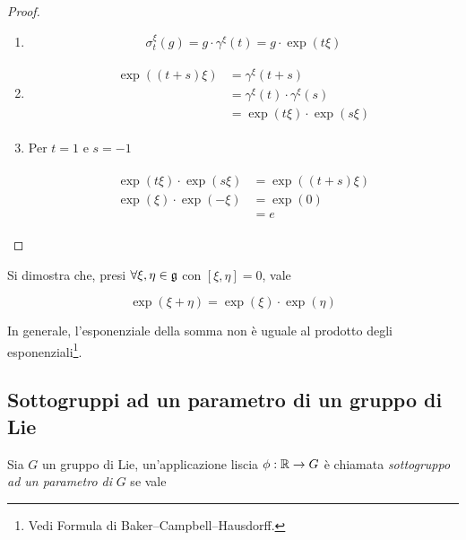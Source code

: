 \begin{proof}\hfill\break
	\begin{enumerate}
		\item %
		\begin{equation}
			\sigma_{t}^{\xi}(g) = g \cdot \gamma^{\xi}(t) = g \cdot \exp(t \xi)
		\end{equation}
		
		\item %
		\begin{align}
			\begin{split}
				\exp((t+s) \xi) &= \gamma^{\xi}(t+s)\\
				&= \gamma^{\xi}(t) \cdot \gamma^{\xi}(s)\\
				&= \exp(t \xi) \cdot \exp(s \xi)
			\end{split}
		\end{align}
		
		\item Per $ t=1 $ e $ s =-1 $
		
		\begin{align}
			\begin{split}
				\exp(t \xi) \cdot \exp(s \xi) &= \exp((t+s) \xi)\\
				\exp(\xi) \cdot \exp(-\xi) &= \exp(0)\\
				&= e
			\end{split}
		\end{align}
	\end{enumerate}
\end{proof}

\begin{remark}
	Si dimostra che, presi $ \forall \xi,\eta \in \mathfrak{g} $ con $ [\xi,\eta] = 0 $, vale
	
	\begin{equation}
		\exp(\xi + \eta) = \exp(\xi) \cdot \exp(\eta)
	\end{equation}

	In generale, l'esponenziale della somma non è uguale al prodotto degli esponenziali\footnote{%
		Vedi Formula di Baker–Campbell–Hausdorff.%
	}.
\end{remark}

\subsection{Sottogruppi ad un parametro di un gruppo di Lie}

Sia $ G $ un gruppo di Lie, un'applicazione liscia $ \phi : \mathbb{R} \to G $ è chiamata \textit{sottogruppo ad un parametro di} $ G $ se vale

